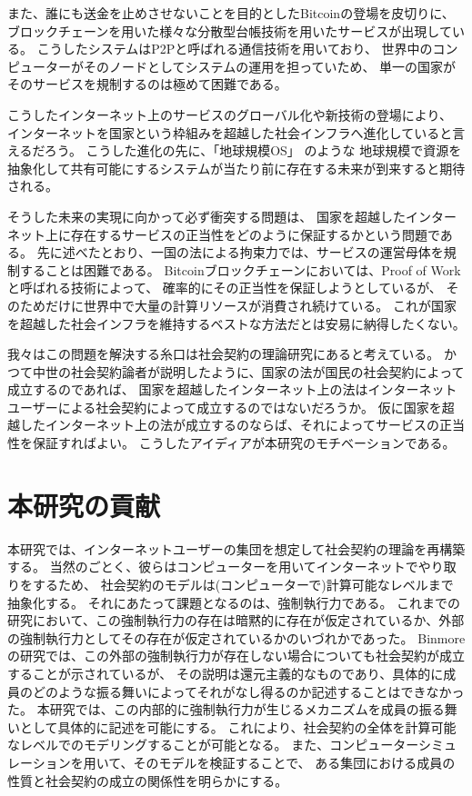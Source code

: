  また、誰にも送金を止めさせないことを目的としたBitcoin\cite{nakamoto2008bitcoin}の登場を皮切りに、
  ブロックチェーンを用いた様々な分散型台帳技術を用いたサービスが出現している。
  こうしたシステムはP2Pと呼ばれる通信技術を用いており、
  世界中のコンピューターがそのノードとしてシステムの運用を担っていため、
  単一の国家がそのサービスを規制するのは極めて困難である。
  
  こうしたインターネット上のサービスのグローバル化や新技術の登場により、
  インターネットを国家という枠組みを超越した社会インフラへ進化していると言えるだろう。
  こうした進化の先に、「地球規模OS」\cite{saito&ikemoto2008} のような
  地球規模で資源を抽象化して共有可能にするシステムが当たり前に存在する未来が到来すると期待される。

  そうした未来の実現に向かって必ず衝突する問題は、
  国家を超越したインターネット上に存在するサービスの正当性をどのように保証するかという問題である。
  先に述べたとおり、一国の法による拘束力では、サービスの運営母体を規制することは困難である。
  Bitcoinブロックチェーンにおいては、Proof of Workと呼ばれる技術によって、
  確率的にその正当性を保証しようとしているが、
  そのためだけに世界中で大量の計算リソースが消費され続けている。
  これが国家を超越した社会インフラを維持するベストな方法だとは安易に納得したくない。

  我々はこの問題を解決する糸口は社会契約の理論研究にあると考えている。
  かつて中世の社会契約論者が説明したように、国家の法が国民の社会契約によって成立するのであれば、
  国家を超越したインターネット上の法はインターネットユーザーによる社会契約によって成立するのではないだろうか。
  仮に国家を超越したインターネット上の法が成立するのならば、それによってサービスの正当性を保証すればよい。
  こうしたアイディアが本研究のモチベーションである。

  \section{本研究の貢献}
  本研究では、インターネットユーザーの集団を想定して社会契約の理論を再構築する。
  当然のごとく、彼らはコンピューターを用いてインターネットでやり取りをするため、
  社会契約のモデルは(コンピューターで)計算可能なレベルまで抽象化する。
  それにあたって課題となるのは、強制執行力である。
  これまでの研究において、この強制執行力の存在は暗黙的に存在が仮定されているか、外部の強制執行力としてその存在が仮定されているかのいづれかであった。
  Binmoreの研究では、この外部の強制執行力が存在しない場合についても社会契約が成立することが示されている\cite{binmore2005}が、
  その説明は還元主義的なものであり、具体的に成員のどのような振る舞いによってそれがなし得るのか記述することはできなかった。
  本研究では、この内部的に強制執行力が生じるメカニズムを成員の振る舞いとして具体的に記述を可能にする。
  これにより、社会契約の全体を計算可能なレベルでのモデリングすることが可能となる。
  また、コンピューターシミュレーションを用いて、そのモデルを検証することで、
  ある集団における成員の性質と社会契約の成立の関係性を明らかにする。

